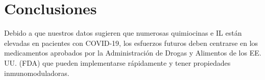 \section{Conclusiones}

Debido a que nuestros datos sugieren que numerosas quimiocinas e IL están elevadas en pacientes con COVID-19, los esfuerzos futuros deben centrarse en los medicamentos aprobados por la Administración de Drogas y Alimentos de los EE. UU. (FDA) que pueden implementarse rápidamente y tener propiedades inmunomoduladoras.

